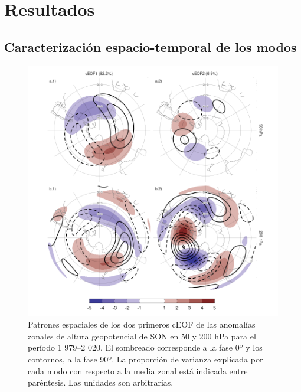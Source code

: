 \documentclass[12pt,oneside,a4paper]{reedthesis}
\begin{document}
\hypertarget{resultados-1}{%
\section{Resultados}\label{resultados-1}}

\hypertarget{caracterizaciuxf3n-espacio-temporal-de-los-modos}{%
\subsection{Caracterización espacio-temporal de los modos}\label{caracterizaciuxf3n-espacio-temporal-de-los-modos}}



\begin{figure}

{\centering \includegraphics{figures/20-ceofs/ceofs-1-1} 

}

\caption{Patrones espaciales de los dos primeros cEOF de las anomalías zonales de altura geopotencial de SON en 50 y 200 hPa para el período 1 979--2 020. El sombreado corresponde a la fase 0º y los contornos, a la fase 90º. La proporción de varianza explicada por cada modo con respecto a la media zonal está indicada entre paréntesis. Las unidades son arbitrarias.}\label{fig:ceofs-1}
\end{figure}
\end{document}
